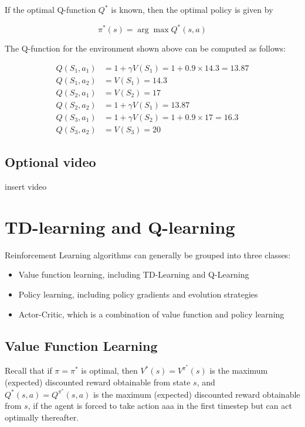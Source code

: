 \documentclass[11pt]{article}
\begin{document}
If the optimal Q-function $Q^*$ is known, then the optimal policy is given by

\[\pi^* (s) = \arg \max Q^* (s,a)\]

The Q-function for the environment shown above can be computed as follows:

\[
\begin{aligned}
    Q(S_1, a_1 ) &= 1 + \gamma V(S_1 ) = 1 + 0.9 \times 14.3 = 13.87 \\
    Q(S_1, a_2 ) &= V(S_1 ) = 14.3 \\
    Q(S_2, a_1 ) &= V(S_2) = 17 \\
    Q(S_2, a_2 ) &= 1 + \gamma V(S_1) = 13.87 \\
    Q(S_3, a_1 ) &= 1 + \gamma V(S_2) = 1 + 0.9 \times 17 = 16.3 \\
    Q(S_3, a_2 ) &= V(S_3) = 20
\end{aligned}
\]

\subsection{Optional video}\label{subsec:optional-video5}
insert video

\section{TD-learning and Q-learning}\label{sec:td-learning-and-q-learning}
Reinforcement Learning algorithms can generally be grouped into three classes:

\begin{itemize}
  \item Value function learning, including TD-Learning and Q-Learning
  \item Policy learning, including policy gradients and evolution strategies
  \item Actor-Critic, which is a combination of value function and policy learning
\end{itemize}

\subsection{Value Function Learning}\label{subsec:value-function-learning}
Recall that if $\pi = \pi^*$ is optimal, then $V^*(s) = V^{\pi^*} (s)$ is the
maximum (expected) discounted reward obtainable from state $s$, and
$Q^*(s,a) = Q^{\pi^*}(s,a)$ is the maximum (expected) discounted reward
obtainable from $s$, if the agent is forced to take action aaa in the first
timestep but can act optimally thereafter.
\end{document}
